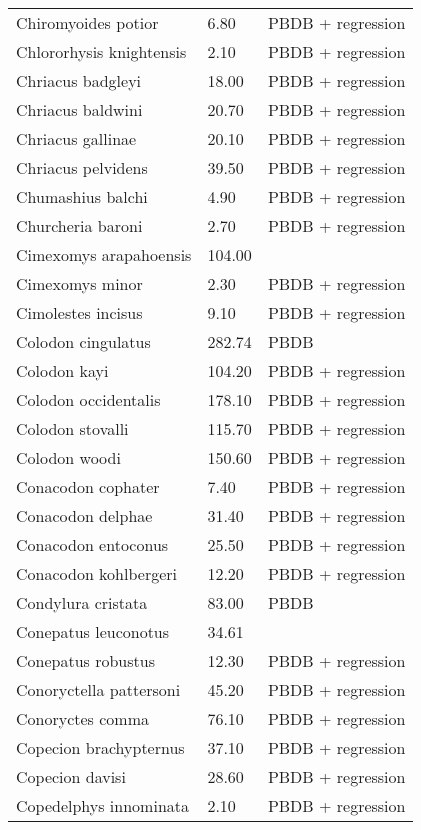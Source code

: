 \begin{longtable}{p{} p{} p{}}
    Chiromyoides potior & 6.80 & PBDB + regression \\ 
    Chlororhysis knightensis & 2.10 & PBDB + regression \\ 
    Chriacus badgleyi & 18.00 & PBDB + regression \\ 
    Chriacus baldwini & 20.70 & PBDB + regression \\ 
    Chriacus gallinae & 20.10 & PBDB + regression \\ 
    Chriacus pelvidens & 39.50 & PBDB + regression \\ 
    Chumashius balchi & 4.90 & PBDB + regression \\ 
    Churcheria baroni & 2.70 & PBDB + regression \\ 
    Cimexomys arapahoensis & 104.00 & \cite{Wilson2012} \\ 
    Cimexomys minor & 2.30 & PBDB + regression \\ 
    Cimolestes incisus & 9.10 & PBDB + regression \\ 
    Colodon cingulatus & 282.74 & PBDB \\ 
    Colodon kayi & 104.20 & PBDB + regression \\ 
    Colodon occidentalis & 178.10 & PBDB + regression \\ 
    Colodon stovalli & 115.70 & PBDB + regression \\ 
    Colodon woodi & 150.60 & PBDB + regression \\ 
    Conacodon cophater & 7.40 & PBDB + regression \\ 
    Conacodon delphae & 31.40 & PBDB + regression \\ 
    Conacodon entoconus & 25.50 & PBDB + regression \\ 
    Conacodon kohlbergeri & 12.20 & PBDB + regression \\ 
    Condylura cristata & 83.00 & PBDB \\ 
    Conepatus leuconotus & 34.61 & \cite{Smith2004} \\ 
    Conepatus robustus & 12.30 & PBDB + regression \\ 
    Conoryctella pattersoni & 45.20 & PBDB + regression \\ 
    Conoryctes comma & 76.10 & PBDB + regression \\ 
    Copecion brachypternus & 37.10 & PBDB + regression \\ 
    Copecion davisi & 28.60 & PBDB + regression \\ 
    Copedelphys innominata & 2.10 & PBDB + regression \\ 

\end{longtable}
